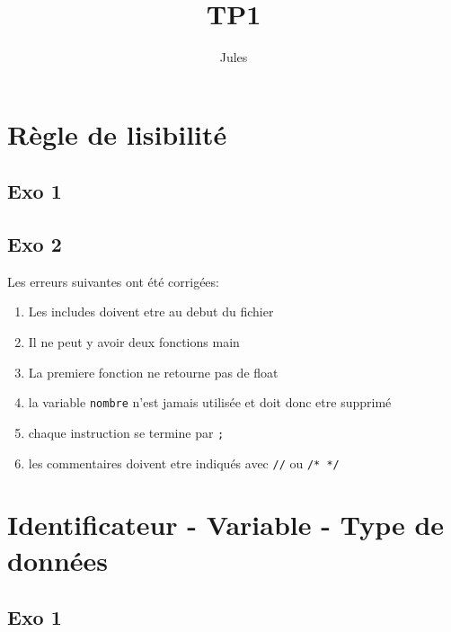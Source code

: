 \documentclass{article}
\title{TP1}
\author{Jules}
\begin{document}
\maketitle

\section[]{Règle de lisibilité}

\subsection{Exo 1}


\subsection{Exo 2}

Les erreurs suivantes ont été corrigées:
\begin{enumerate}
    \item Les includes doivent etre au debut du fichier
    \item Il ne peut y avoir deux fonctions main
    \item La premiere fonction ne retourne pas de float
    \item la variable \texttt{nombre} n'est jamais utilisée et doit donc
    etre supprimé
    \item chaque instruction se termine par \texttt{;}
    \item les commentaires doivent etre indiqués avec \texttt{//} ou \texttt{/* */}
\end{enumerate}



\section[]{Identificateur - Variable - Type de données}

\subsection{Exo 1}
\end{document}
